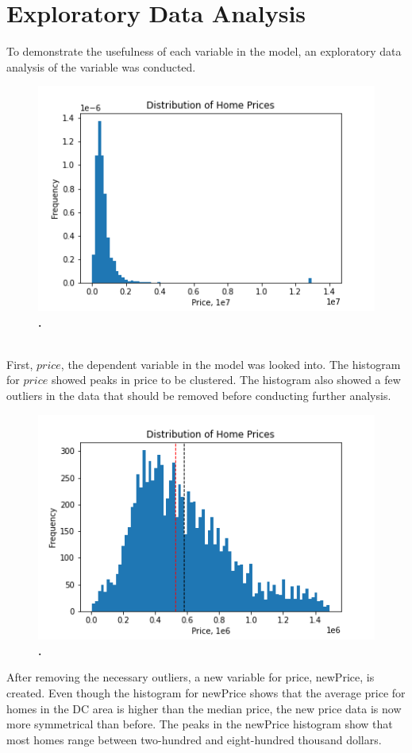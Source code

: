 \documentclass[12pt]{report}
\begin{document}
\section*{Exploratory Data Analysis}
To demonstrate the usefulness of each variable in the model, an exploratory data analysis of the variable was conducted. 
\begin{figure}[h]
\begin{center}
\includegraphics[width=130mm]{priceHist.png}
\end{center}
\caption{\textbf{.}}
\label{fig:priceHist}
\end{figure}
\\
First, $price$, the dependent variable in the model was looked into. The histogram for $price$ showed peaks in price to be clustered. The histogram also showed a few outliers in the data that should be removed before conducting further analysis.

\clearpage
\begin{figure}[h]
\begin{center}
\includegraphics[width=130mm]{newPriceHist.png}
\end{center}
\caption{\textbf{.}}
\label{fig:NewpriceHist}
\end{figure}
After removing the necessary outliers, a new variable for price, newPrice, is created. Even though the histogram for newPrice shows that the average price for homes in the DC area is higher than the median price, the new price data is now more symmetrical than before. The peaks in the newPrice histogram show that most homes range between two-hundred and eight-hundred thousand dollars. \\
\clearpage
\end{document}
